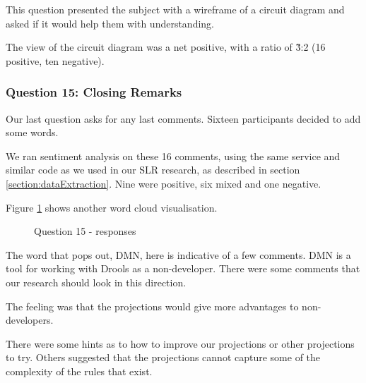 This question presented the subject with a wireframe of a circuit diagram and asked if it would help them with understanding.

The view of the circuit diagram was a net positive, with a ratio of \~3:2 (16 positive, ten negative).

\subsubsection{Question 15: Closing Remarks}

Our last question asks for any last comments.
Sixteen participants decided to add some words.

We ran sentiment analysis on these 16 comments, using the same service and similar code as we used in our SLR research, as described in section \ref{section:dataExtraction}.
Nine were positive, six mixed and one negative.

Figure \ref{fig:Q15_wordcloud} shows another word cloud visualisation.

\begin{figure}[h]
    \centering
    \caption{Question 15 - responses}
    \label{fig:Q15_wordcloud}
\end{figure}

The word that pops out, DMN, here is indicative of a few comments.
DMN is a tool for working with Drools as a non-developer.
There were some comments that our research should look in this direction.

The feeling was that the projections would give more advantages to non-developers.

There were some hints as to how to improve our projections or other projections to try.
Others suggested that the projections cannot capture some of the complexity of the rules that exist.

